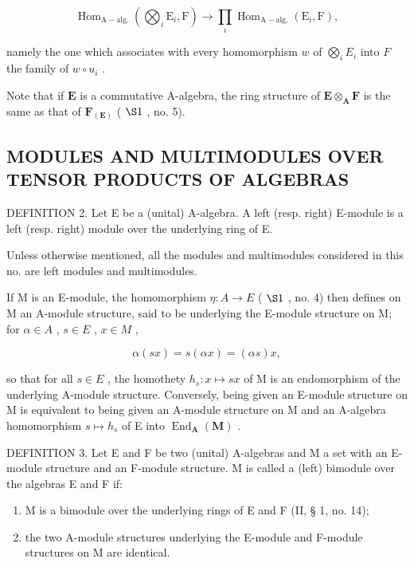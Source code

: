 \[
\operatorname{Hom} _ {\mathrm{A-alg.}} \left(\bigotimes_ {i} \mathrm{E} _ {i}, \mathrm{F}\right)\rightarrow \prod_ {i} \operatorname{Hom} _ {\mathrm{A-alg.}} (\mathrm{E} _ {i}, \mathrm{F}),\tag{6}
\]

namely the one which associates with every homomorphism \(w\) of \(\bigotimes_{i} E_{i}\) into \(F\) the family of \(w \circ u_{i}\) .

Note that if \(\mathbf{E}\) is a commutative A-algebra, the ring structure of \(\mathbf{E} \otimes_{\mathbf{A}} \mathbf{F}\) is the same as that of \(\mathbf{F}_{(\mathbf{E})}\) ( \(\S 1\) , no. 5).

\subsection{MODULES AND MULTIMODULES OVER TENSOR PRODUCTS OF ALGEBRAS}

DEFINITION 2. Let E be a (unital) A-algebra. A left (resp. right) E-module is a left (resp. right) module over the underlying ring of E.

Unless otherwise mentioned, all the modules and multimodules considered in this no. are left modules and multimodules.

If M is an E-module, the homomorphism \(\eta: A \to E\) ( \(\S 1\) , no. 4) then defines on M an A-module structure, said to be underlying the E-module structure on M; for \(\alpha \in A\) , \(s \in E\) , \(x \in M\) ,

\[
\alpha (s x) = s (\alpha x) = (\alpha s) x,\tag{7}
\]

so that for all \(s \in E\) , the homothety \(h_{s}: x \mapsto sx\) of M is an endomorphism of the underlying A-module structure. Conversely, being given an E-module structure on M is equivalent to being given an A-module structure on M and an A-algebra homomorphism \(s \mapsto h_{s}\) of E into \(\operatorname{End}_{\mathbf{A}}(\mathbf{M})\) .

DEFINITION 3. Let E and F be two (unital) A-algebras and M a set with an E-module structure and an F-module structure. M is called a (left) bimodule over the algebras E and F if:

\begin{enumerate}
\def\labelenumi{(\arabic{enumi})}
\item
  M is a bimodule over the underlying rings of E and F (II, § 1, no. 14);
\item
  the two A-module structures underlying the E-module and F-module structures on M are identical.
\end{enumerate}

